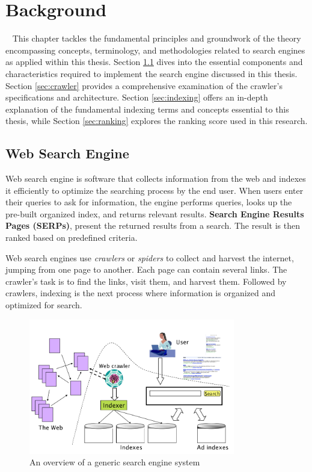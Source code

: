 \chapter{Background}\
\label{chap:background}
This chapter tackles the fundamental principles and groundwork of the theory encompassing concepts, terminology, and methodologies related to search engines as applied within this thesis. Section \ref{sec:web-search-engine} dives into the essential components and characteristics required to implement the search engine discussed in this thesis. Section \ref{sec:crawler} provides a comprehensive examination of the crawler's specifications and architecture. Section \ref{sec:indexing} offers an in-depth explanation of the fundamental indexing terms and concepts essential to this thesis, while Section \ref{sec:ranking} explores the ranking score used in this research.


\section{Web Search Engine}
\label{sec:web-search-engine}
Web search engine is software that collects information from the web and indexes it efficiently to optimize the searching process by the end user. When users enter their queries to ask for information, the engine performs queries, looks up the pre-built organized index, and returns relevant results. \textbf{Search Engine Results Pages (SERPs)}, present the returned results from a search. The result is then ranked based on predefined criteria. 

Web search engines use \textit{crawlers} or \textit{spiders} to collect and harvest the internet, jumping from one page to another. Each page can contain several links. The crawler's task is to find the links, visit them, and harvest them. Followed by crawlers, indexing is the next process where information is organized and optimized for search.

\begin{figure}[h]	
     \centering
         \includegraphics[width=9cm]{figures/engine_components.png}
              \caption{An overview of a generic search engine system \cite{lmu2014}}
     \label{fig:search-engine-overvoew}
\end{figure}

